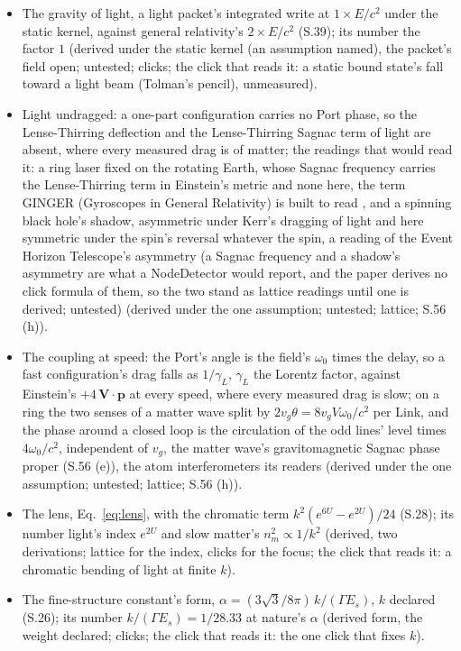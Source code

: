 \documentclass[pdflatex,sn-mathphys-num]{sn-jnl}
\theoremstyle{thmstyleone}
\theoremstyle{thmstyletwo}
\begin{document}
\begin{itemize}[nosep,leftmargin=1.2em]
\item The gravity of light, a light packet's integrated write at $1 \times E / c^2$ under the static kernel, against general relativity's $2 \times E / c^2$ (S.39); its number the factor $1$ (derived under the static kernel (an assumption named), the packet's field open; untested; clicks; the click that reads it: a static bound state's fall toward a light beam (Tolman's pencil), unmeasured).
\item Light undragged: a one-part configuration carries no Port phase, so the Lense-Thirring deflection and the Lense-Thirring Sagnac term of light are absent, where every measured drag is of matter; the readings that would read it: a ring laser fixed on the rotating Earth, whose Sagnac frequency carries the Lense-Thirring term in Einstein's metric and none here, the term GINGER (Gyroscopes in General Relativity) is built to read \cite{ginger}, and a spinning black hole's shadow, asymmetric under Kerr's dragging of light and here symmetric under the spin's reversal whatever the spin, a reading of the Event Horizon Telescope's asymmetry \cite{eht_sgra} (a Sagnac frequency and a shadow's asymmetry are what a NodeDetector would report, and the paper derives no click formula of them, so the two stand as lattice readings until one is derived; untested) (derived under the one assumption; untested; lattice; S.56 (h)).
\item The coupling at speed: the Port's angle is the field's $\omega_0$ times the delay, so a fast configuration's drag falls as $1 / \gamma_L$, $\gamma_L$ the Lorentz factor, against Einstein's $+4\,\mathbf V\cdot\mathbf p$ at every speed, where every measured drag is slow; on a ring the two senses of a matter wave split by $2v_g\theta = 8v_g V\omega_0 / c^2$ per Link, and the phase around a closed loop is the circulation of the odd lines' level times $4\omega_0 / c^2$, independent of $v_g$, the matter wave's gravitomagnetic Sagnac phase proper (S.56 (e)), the atom interferometers its readers (derived under the one assumption; untested; lattice; S.56 (h)).
\item The lens, Eq.~\eqref{eq:lens}, with the chromatic term $k^2 (e^{6U} - e^{2U}) / 24$ (S.28); its number light's index $e^{2U}$ and slow matter's $n_m^2 \propto 1 / k^2$ (derived, two derivations; lattice for the index, clicks for the focus; the click that reads it: a chromatic bending of light at finite $k$).
\item The fine-structure constant's form, $\alpha = (3\sqrt 3 / 8\pi)\,k / (\Gamma E_s)$, $k$ declared (S.26); its number $k / (\Gamma E_s) = 1 / 28.33$ at nature's $\alpha$ (derived form, the weight declared; clicks; the click that reads it: the one click that fixes $k$).

\end{itemize}
\end{document}
